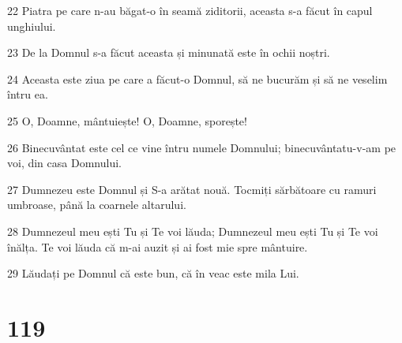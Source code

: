 \par 22 Piatra pe care n-au băgat-o în seamă ziditorii, aceasta s-a făcut în capul unghiului.
\par 23 De la Domnul s-a făcut aceasta și minunată este în ochii noștri.
\par 24 Aceasta este ziua pe care a făcut-o Domnul, să ne bucurăm și să ne veselim întru ea.
\par 25 O, Doamne, mântuiește! O, Doamne, sporește!
\par 26 Binecuvântat este cel ce vine întru numele Domnului; binecuvântatu-v-am pe voi, din casa Domnului.
\par 27 Dumnezeu este Domnul și S-a arătat nouă. Tocmiți sărbătoare cu ramuri umbroase, până la coarnele altarului.
\par 28 Dumnezeul meu ești Tu și Te voi lăuda; Dumnezeul meu ești Tu și Te voi înălța. Te voi lăuda că m-ai auzit și ai fost mie spre mântuire.
\par 29 Lăudați pe Domnul că este bun, că în veac este mila Lui.

\chapter{119}

